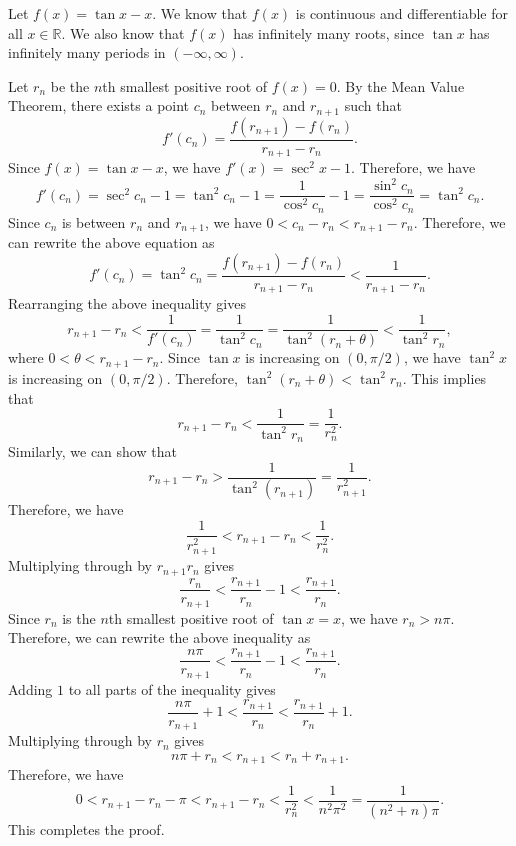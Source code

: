 Let $f(x) = \tan x - x$. We know that $f(x)$ is continuous and differentiable for all $x \in \mathbb{R}$. We also know that $f(x)$ has infinitely many roots, since $\tan x$ has infinitely many periods in $(-\infty, \infty)$.

Let $r_n$ be the $n$th smallest positive root of $f(x) = 0$. By the Mean Value Theorem, there exists a point $c_n$ between $r_n$ and $r_{n+1}$ such that
\[
f'(c_n) = \frac{f(r_{n+1}) - f(r_n)}{r_{n+1} - r_n}.
\]
Since $f(x) = \tan x - x$, we have $f'(x) = \sec^2 x - 1$. Therefore, we have
\[
f'(c_n) = \sec^2 c_n - 1 = \tan^2 c_n - 1 = \frac{1}{\cos^2 c_n} - 1 = \frac{\sin^2 c_n}{\cos^2 c_n} = \tan^2 c_n.
\]
Since $c_n$ is between $r_n$ and $r_{n+1}$, we have $0 < c_n - r_n < r_{n+1} - r_n$. Therefore, we can rewrite the above equation as
\[
f'(c_n) = \tan^2 c_n = \frac{f(r_{n+1}) - f(r_n)}{r_{n+1} - r_n} < \frac{1}{r_{n+1} - r_n}.
\]
Rearranging the above inequality gives
\[
r_{n+1} - r_n < \frac{1}{f'(c_n)} = \frac{1}{\tan^2 c_n} = \frac{1}{\tan^2(r_n + \theta)} < \frac{1}{\tan^2 r_n},
\]
where $0 < \theta < r_{n+1} - r_n$. Since $\tan x$ is increasing on $(0, \pi/2)$, we have $\tan^2 x$ is increasing on $(0, \pi/2)$. Therefore, $\tan^2(r_n + \theta) < \tan^2 r_n$. This implies that
\[
r_{n+1} - r_n < \frac{1}{\tan^2 r_n} = \frac{1}{r_n^2}.
\]
Similarly, we can show that
\[
r_{n+1} - r_n > \frac{1}{\tan^2(r_{n+1})} = \frac{1}{r_{n+1}^2}.
\]
Therefore, we have
\[
\frac{1}{r_{n+1}^2} < r_{n+1} - r_n < \frac{1}{r_n^2}.
\]
Multiplying through by $r_{n+1}r_n$ gives
\[
\frac{r_n}{r_{n+1}} < \frac{r_{n+1}}{r_n} - 1 < \frac{r_{n+1}}{r_n}.
\]
Since $r_n$ is the $n$th smallest positive root of $\tan x = x$, we have $r_n > n\pi$. Therefore, we can rewrite the above inequality as
\[
\frac{n\pi}{r_{n+1}} < \frac{r_{n+1}}{r_n} - 1 < \frac{r_{n+1}}{r_n}.
\]
Adding $1$ to all parts of the inequality gives
\[
\frac{n\pi}{r_{n+1}} + 1 < \frac{r_{n+1}}{r_n} < \frac{r_{n+1}}{r_n} + 1.
\]
Multiplying through by $r_n$ gives
\[
n\pi + r_n < r_{n+1} < r_n + r_{n+1}.
\]
Therefore, we have
\[
0 < r_{n+1} - r_n - \pi < r_{n+1} - r_n < \frac{1}{r_n^2} < \frac{1}{n^2\pi^2} = \frac{1}{(n^2+n)\pi}.
\]
This completes the proof.
